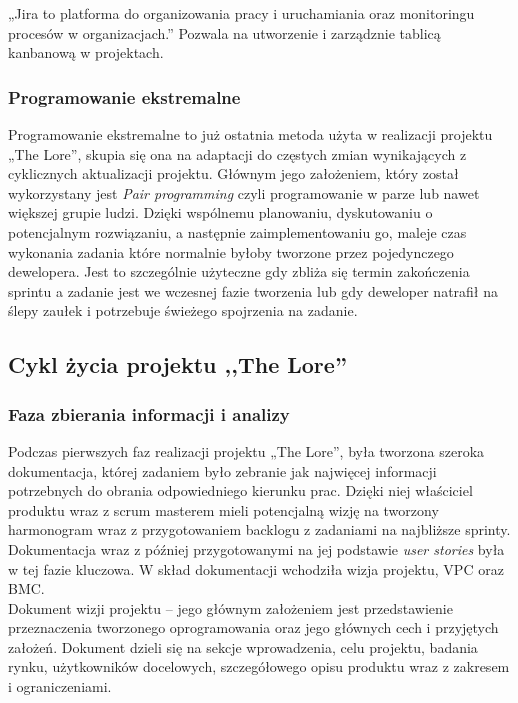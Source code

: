 \documentclass[oneside,polski,logo]{amuthesis}
\begin{document}
„Jira to platforma do organizowania pracy i uruchamiania oraz monitoringu procesów w organizacjach.”  \cite{jira} Pozwala na utworzenie i zarządznie tablicą kanbanową w projektach.

\subsubsection{Programowanie ekstremalne}

Programowanie ekstremalne to już ostatnia metoda użyta w realizacji projektu „The Lore”, skupia się ona na adaptacji do częstych zmian wynikających z cyklicznych aktualizacji projektu. Głównym jego założeniem, który został wykorzystany jest \emph{Pair programming} czyli programowanie w parze lub nawet większej grupie ludzi. Dzięki wspólnemu planowaniu, dyskutowaniu o potencjalnym rozwiązaniu, a następnie zaimplementowaniu go, maleje czas wykonania zadania które normalnie byłoby tworzone przez pojedynczego dewelopera. Jest to szczególnie użyteczne gdy zbliża się termin zakończenia sprintu a zadanie jest we wczesnej fazie tworzenia lub gdy deweloper natrafił na ślepy zaułek i potrzebuje świeżego spojrzenia na zadanie. \\

\subsection{Cykl życia projektu ,,The Lore''}

\subsubsection{Faza zbierania informacji i analizy}

Podczas pierwszych faz realizacji projektu „The Lore”, była tworzona szeroka dokumentacja, której zadaniem było zebranie jak najwięcej informacji potrzebnych do obrania odpowiedniego kierunku prac. Dzięki niej właściciel produktu wraz z scrum masterem mieli potencjalną wizję na tworzony harmonogram wraz z przygotowaniem backlogu z zadaniami na najbliższe sprinty. Dokumentacja wraz z później przygotowanymi na jej podstawie \emph{user stories} była w tej fazie kluczowa. W skład dokumentacji wchodziła wizja projektu, VPC oraz BMC.\\

Dokument wizji projektu – jego głównym założeniem jest przedstawienie przeznaczenia tworzonego oprogramowania oraz jego głównych cech i przyjętych założeń. Dokument dzieli się na sekcje wprowadzenia, celu projektu, badania rynku, użytkowników docelowych, szczegółowego opisu produktu wraz z zakresem i ograniczeniami. \\
\end{document}
